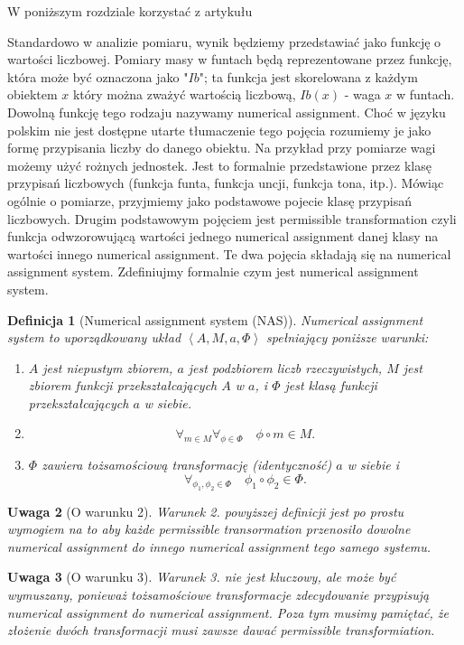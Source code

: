 \documentclass[12pt,a4paper]{report}
\newtheorem{definition}{Definicja}[chapter]
\newtheorem{remark}[definition]{Uwaga}
\newcommand{\tuple}[1]{\left\langle {#1} \right\rangle}
\begin{document}
W poniższym rozdziale korzystać z artykułu {\citep{adams1965theory}}

Standardowo w analizie pomiaru, wynik będziemy przedstawiać jako funkcję o wartości liczbowej. Pomiary masy w funtach będą reprezentowane przez funkcję, która może być oznaczona jako "$Ib$";  ta funkcja jest skorelowana z każdym obiektem $x$ który można zważyć wartością liczbową, $Ib(x)$ - waga $x$ w funtach. Dowolną funkcję tego rodzaju nazywamy numerical assignment. Choć w języku polskim nie jest dostępne utarte tłumaczenie tego pojęcia rozumiemy je jako formę przypisania liczby do danego obiektu. Na przykład przy pomiarze wagi możemy użyć rożnych jednostek. Jest to formalnie przedstawione  przez klasę przypisań liczbowych (funkcja funta, funkcja uncji, funkcja tona, itp.). Mówiąc ogólnie o pomiarze, przyjmiemy jako podstawowe pojecie klasę przypisań liczbowych. Drugim podstawowym pojęciem jest permissible transformation czyli funkcja odwzorowującą wartości jednego numerical assignment danej klasy na wartości innego numerical assignment. Te dwa pojęcia składają się na numerical assignment system. Zdefiniujmy formalnie czym jest numerical assignment system.
\begin{definition}[Numerical assignment system (NAS)]
Numerical assignment system to uporządkowany układ $\tuple{A, M, a, \Phi}$ spełniający poniższe warunki:
\begin{enumerate}
\item
$A$ jest niepustym zbiorem, $a$ jest podzbiorem liczb rzeczywistych, $M$ jest zbiorem funkcji przekształcających $A$ w $a$, i $\Phi$ jest klasą funkcji przekształcających $a$ w siebie.  
\item
$$
\forall_{m \in M} \forall_{\phi \in \Phi} \quad \phi \circ m \in M.
$$ 
\item
$\Phi$ zawiera tożsamościową transformację (identyczność) $a$ w siebie i 
$$
\forall_{\phi_{1}, \phi_{2} \in \Phi} \quad \phi_{1} \circ \phi_{2} \in \Phi.
$$

\end{enumerate}

\end{definition}

\begin{remark}[O warunku 2]
Warunek 2. powyższej definicji jest po prostu wymogiem na to aby każde permissible transormation przenosiło dowolne numerical assignment do innego numerical assignment tego samego systemu.
\end{remark}

\begin{remark}[O warunku 3]
Warunek 3. nie jest kluczowy, ale może być wymuszany, ponieważ tożsamościowe transformacje zdecydowanie przypisują numerical assignment do numerical assignment. Poza tym musimy pamiętać, że złożenie dwóch transformacji musi zawsze dawać permissible transformiation.
\end{remark}
\end{document}
